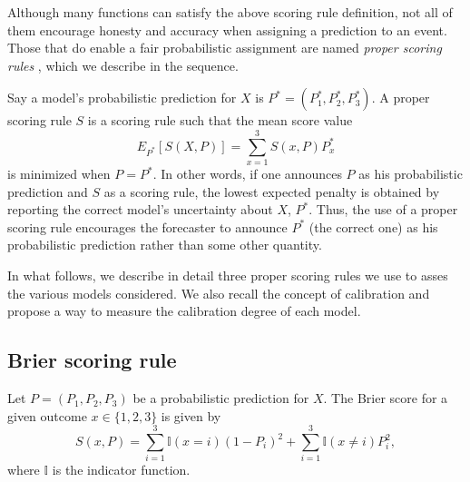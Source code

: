 \documentclass[journal,article,accept,moreauthors,pdftex,12pt,a4paper]{mdpi}
\begin{document}
    Although many functions can satisfy the above scoring rule definition, not all of them encourage honesty and accuracy when assigning a prediction to an event. Those that do enable a fair probabilistic assignment are named \emph{proper scoring rules} \cite{lad}, which we describe in the sequence.


    Say a model's probabilistic prediction for $X$ is $P^*=(P_1^*,P_2^*,P_3^*).$ A proper scoring rule $S$ is a scoring rule  such that the mean score value
    $$E_{P^*}[S(X,P)]=\sum_{x=1}^3 S(x,P)P^*_x$$
     is minimized when $P=P^*$.
    In other words, if one announces
    $P$ as his probabilistic prediction
    and $S$ as a scoring rule, the lowest
    expected penalty is obtained by reporting the correct model's  uncertainty about $X$, $P^*$.
    Thus, the use of a proper scoring rule encourages the forecaster to announce $P^*$ (the correct one)
    as his probabilistic prediction  rather than some other quantity.

    In what follows, we describe in detail three proper scoring rules we use to asses the various models considered.
    We also recall the concept of calibration and propose a way to measure the calibration degree of each model.




    \subsection{Brier scoring rule}

    Let $P=(P_1,P_2,P_3)$ be a probabilistic prediction  for $X$.
    The Brier score for a given outcome $x\in\{1,2,3\}$ is given by
    $$S(x,P)= \sum_{i=1}^3\mathbb{I}(x=i)(1- P_i)^2+\sum_{i=1}^3\mathbb{I}(x\neq i)P^2_i,$$
    where $\mathbb{I}$ is the indicator function.
\end{document}
